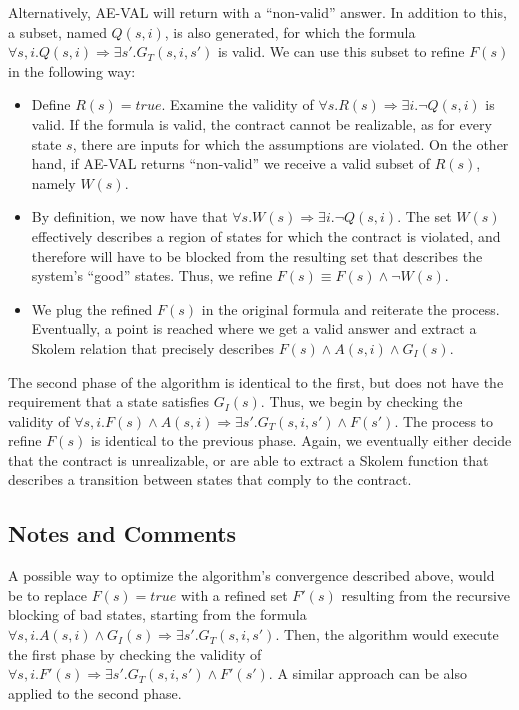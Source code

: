 \documentclass{article}
\begin{document}
Alternatively, AE-VAL will return with a ``non-valid'' answer. In addition to
this, a subset, named $Q(s,i)$, is also generated, for which the formula
$\forall s,i. Q(s,i) \Rightarrow \exists s'. G_{T}(s,i,s')$ is valid.
We can use this subset to refine $F(s)$ in the following way:

\begin{itemize}
  \item Define $R(s) = true$. Examine the validity of $\forall s. R(s)
  \Rightarrow \exists i. \lnot Q(s,i)$ is valid. If the formula is valid, the
  contract cannot be realizable, as for every state $s$, there are inputs for
  which the assumptions are violated. On the other hand, if AE-VAL returns ``non-valid'' we receive
  a valid subset of $R(s)$, namely $W(s)$.
  \item By definition, we now have that $\forall s. W(s) \Rightarrow \exists i.
  \lnot Q(s,i)$. The set $W(s)$ effectively describes a region of states for
  which the contract is violated, and therefore will have to be blocked from the
  resulting set that describes the system's ``good'' states. Thus, we refine
  $F(s) \equiv F(s) \land \lnot W(s)$.
  \item We plug the refined $F(s)$ in the original formula and reiterate the
  process. Eventually, a point is reached where we get a valid answer and
  extract a Skolem relation that precisely describes $F(s) \land A(s,i) \land
  G_I(s)$.
\end{itemize}

The second phase of the algorithm is identical to the first, but does not have
the requirement that a state satisfies $G_I(s)$. Thus, we begin by checking the
validity of $\forall s,i. F(s) \land A(s,i) \Rightarrow \exists s'.
G_{T}(s,i,s') \land F(s')$. The process to refine $F(s)$ is identical to the
previous phase. Again, we eventually either decide that the contract is
unrealizable, or are able to extract a Skolem function that describes a
transition between states that comply to the contract.


\subsection{Notes and Comments}

A possible way to optimize the algorithm's convergence described above, would be
to replace $F(s) = true$ with a refined set $F'(s)$ resulting from the recursive
blocking of bad states, starting from the formula $\forall s,i. A(s,i) \land G_I(s) \Rightarrow
\exists s'. G_T(s,i,s')$. Then, the algorithm would execute the first phase by
checking the validity of $\forall s,i. F'(s) \Rightarrow \exists s'.
G_{T}(s,i,s') \land F'(s')$. A similar approach can be also applied to the
second phase.
\end{document}
